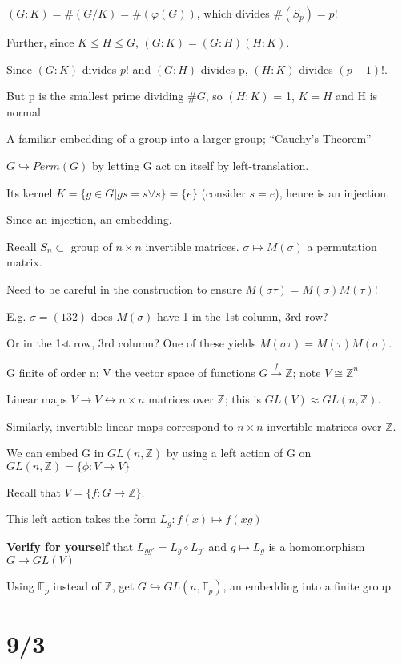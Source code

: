 \documentclass[12pt]{article}
\begin{document}
$(G : K) = \#(G\slash K) = \#(\varphi(G))$, which divides $\#(S_p) = p!$

Further, since $K \leq H \leq G$, $(G : K) = (G : H)(H : K)$.

Since $(G : K)$ divides $p!$ and $(G : H)$ divides p, $(H : K)$ divides $(p - 1)!$.

But p is the smallest prime dividing $\#G$, so $(H : K)$ = 1, $K = H$ and H is normal.

\noindent
A familiar embedding of a group into a larger group; ``Cauchy's Theorem''

$G \hookrightarrow Perm(G)$ by letting G act on itself by left-translation.

Its kernel $K = \{g \in G | gs=s \forall s\} = \{e\}$ (consider $s = e$), hence is an injection.

Since an injection, an embedding.

\noindent
Recall $S_n \subset$ group of $n \times n$ invertible matrices. $\sigma \mapsto M(\sigma)$ a permutation matrix.

Need to be careful in the construction to ensure $M(\sigma\tau)=M(\sigma)M(\tau)$!

E.g. $\sigma = (1 3 2)$ does $M(\sigma)$ have 1 in the 1st column, 3rd row?

Or in the 1st row, 3rd column?  One of these yields $M(\sigma\tau) = M(\tau)M(\sigma)$.

\noindent
G finite of order n; V the vector space of functions $G \xrightarrow{f} \mathds{Z}$; note $V \cong \mathds{Z}^n$

Linear maps $V \to V \leftrightarrow n \times n$ matrices over $\mathds{Z}$; this is $GL(V) \approx GL(n, \mathds{Z})$.

Similarly, invertible linear maps correspond to $n \times n$ invertible matrices over $\mathds{Z}$.

We can embed G in $GL(n, \mathds{Z})$ by using a left action of G on $GL(n, \mathds{Z}) = \{\phi: V \to V\}$

Recall that $V = \{f : G \to \mathds{Z}\}$.

This left action takes the form $L_g: f(x) \mapsto f(xg)$

\textbf{Verify for yourself} that $L_{gg'} = L_g \circ L_{g'}$ and $g \mapsto L_g$ is a homomorphism $G \to GL(V)$

Using $\mathds{F}_p$ instead of $\mathds{Z}$, get $G \hookrightarrow GL(n, \mathds{F}_p)$, an embedding into a finite group

\section{9/3}
\end{document}
